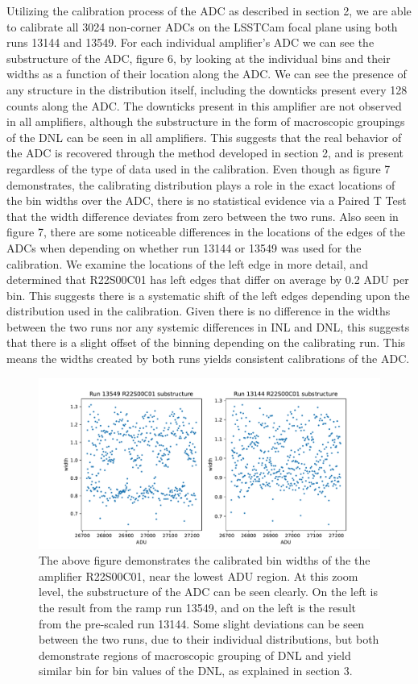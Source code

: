 \documentclass[11pt, letterpaper]{article}
\begin{document}
Utilizing the calibration process of the ADC as described in section 2, we are able to calibrate all 3024 non-corner ADCs on the LSSTCam focal plane using both runs 13144 and 13549. 
For each individual amplifier’s ADC we can see the substructure of the ADC, figure 6, by looking at the individual bins and their widths as a function of their location along the ADC. 
We can see the presence of any structure in the distribution itself, including the downticks present every 128 counts along the ADC. 
The downticks present in this amplifier are not observed in all amplifiers, although the substructure in the form of macroscopic groupings of the DNL can be seen in all amplifiers.
This suggests that the real behavior of the ADC is recovered through the method developed in section 2, and is present regardless of the type of data used in the calibration.
Even though as figure 7 demonstrates, the calibrating distribution plays a role in the exact locations of the bin widths over the ADC, there is no statistical evidence via a Paired T Test that the width difference deviates from zero between the two runs.  
Also seen in figure 7, there are some noticeable differences in the locations of the edges of the ADCs when depending on whether run 13144 or 13549 was used for the calibration.
We examine the locations of the left edge in more detail, and determined that R22S00C01 has left edges that differ on average by 0.2 ADU per bin. 
This suggests there is a systematic shift of the left edges depending upon the distribution used in the calibration.
Given there is no difference in the widths between the two runs nor any systemic differences in INL and DNL, this suggests that there is a slight offset of the binning depending on the calibrating run.
This means the widths created by both runs yields consistent calibrations of the ADC. 

\begin{figure}
    \centering
    \includegraphics[width=0.5\linewidth]{substructure.pdf}
    \caption{The above figure demonstrates the calibrated bin widths of the the amplifier R22S00C01, near the lowest ADU region. At this zoom level, the substructure of the ADC can be seen clearly. On the left is the result from the ramp run 13549, and on the left is the result from the pre-scaled run 13144.  Some slight deviations can be seen between the two runs, due to their individual distributions, but both demonstrate regions of macroscopic grouping of DNL and yield similar bin for bin values of the DNL, as explained in section 3.}
\end{figure}
\end{document}

